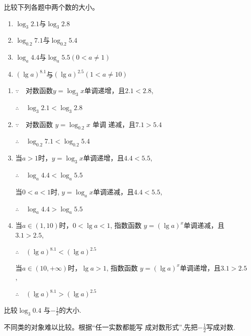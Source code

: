 \begin{example}
    比较下列各题中两个数的大小。
    \begin{multicols}{2}
\begin{enumerate}[(1)]
    \item $\log_3 2.1$与$\log _3 2.8$
    \item $\log_{0.2}7.1$与$\log_{0.2}5.4$
    \item $\log_{a}4.4$与$\log_a 5.5$\quad $(0<a\neq1)$
    \item $(\lg a)^{8.1}$与$(\lg a)^{2.5}$\quad $(1<a\neq10)$
\end{enumerate}        
    \end{multicols}

\end{example}

\begin{solution}
\begin{enumerate}[(1)]
\item $\because \quad $对数函数$y=\log_3 x$单调递增，且$2.1<
2.8$, 

$\therefore\quad \log_3 2.1<\log_3 2.8$
\item $\because\quad $对数函数 $y=\log_{0.2}x$ 单调 递减，且$7.1>
5.4$

$\therefore\quad \log_{0.2}7.1<\log_{0.2}5.4$
\item 当$a>1$时，$y=\log_3 x$单调递增，且$4.4<5.5$,

$\therefore\quad \log_a 4.4< \log _{a}5.5$

当$0<a<1$时, $y=\log_a x$单调递减，且$4.4<5.5$,

$\therefore \quad \log_a 4.4> \log_a 5.5$
\item 当$a\in(1,10)$时，$0<\lg a<1$, 指数函数
$y=(\lg a)^{x}$单调递减，且$3.1>2.5$,

$\therefore\quad (\lg a)^{8.1}<(\lg a)^{2.5}$

当$a\in(10,+\infty)$时，$\lg a>1$, 指数函数
$y=(\lg a)^{x}$单调递增，且$3.1>2.5$,

$\therefore\quad (\lg a)^{8.1}>(\lg a)^{2.5}$
\end{enumerate}
\end{solution}

\begin{example}
 比较$\log_3 0.4$ 与$-\frac12$的大小.   
\end{example}

\begin{analyze}
    不同类的对象难以比较。根据“任一实数都能写
成对数形式”,先把$-\frac12$写成对数.
\end{analyze}

